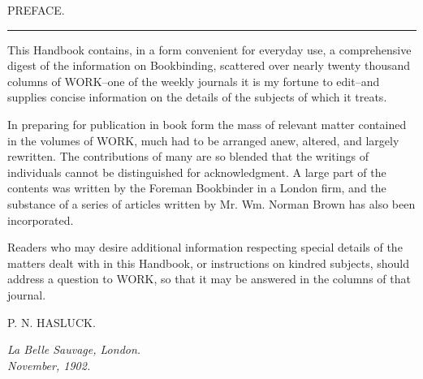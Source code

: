 \documentclass[twoside]{book}
\begin{document}
\vspace*{\fill}

\pagebreak

\vspace*{\fill}
\pagebreak

\pagestyle{empty} %

\vspace*{\fill}

\begin{center}

\begin{Large}
PREFACE.
\end{Large}

\rule{0.5cm}{1pt.}

\end{center}

\noindent This Handbook contains, in a form convenient for
everyday use, a comprehensive digest of the information
on Bookbinding, scattered over nearly twenty
thousand columns of WORK--one of the weekly journals
it is my fortune to edit--and supplies concise
information on the details of the subjects of which it
treats.

In preparing for publication in book form the mass
of relevant matter contained in the volumes of
WORK, much had to be arranged anew, altered, and
largely rewritten. The contributions of many are so
blended that the writings of individuals cannot be
distinguished for acknowledgment. A large part of the
contents was written by the Foreman Bookbinder
in a London firm, and the substance of a series of
articles written by Mr. Wm. Norman Brown has also
been incorporated.

Readers who may desire additional information
respecting special details of the matters dealt with
in this Handbook, or instructions on kindred subjects,
should address a question to WORK, so that it may
be answered in the columns of that journal.\\

\begin{flushright}P. N. HASLUCK. \\ \end{flushright}

\noindent
\textit{La Belle Sauvage, London.}\\
\textit{November, 1902.}

\vspace*{\fill}

\pagebreak

\end{document}
